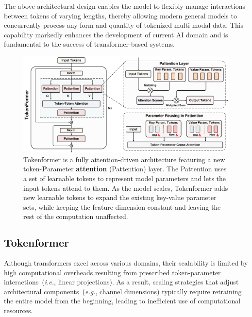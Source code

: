 \documentclass{article} %
\newcommand{\ourmethod}{Tokenformer\xspace}
\begin{document}
The above architectural design enables the model to flexibly manage interactions between tokens of varying lengths, thereby allowing modern general models to concurrently process any form and quantity of tokenized multi-modal data. This capability markedly enhances the development of current AI domain and is fundamental to the success of transformer-based systems.

\begin{figure}[h]
\centering
\includegraphics[width=\textwidth]{./arch2.pdf}
\caption{{\ourmethod} is a fully attention-driven architecture featuring a new token-\textbf{P}arameter \textbf{attention} (Pattention) layer. 
The Pattention uses a set of learnable tokens to represent model parameters and lets the input tokens attend to them. As the model scales, \ourmethod adds new learnable tokens to expand the existing key-value parameter sets, while keeping the feature dimension constant and leaving the rest of the computation unaffected.
}
\vspace{-8pt}
\label{fig:att_token_param}
\end{figure}

\subsection{\ourmethod} \label{sec:tokenformer}

Although transformers excel across various domains, their scalability is limited by high computational overheads resulting from prescribed token-parameter interactions~(\textit{i.e.}, linear projections). As a result, scaling strategies that adjust architectural components~(\textit{e.g.}, channel dimensions) typically require retraining the entire model from the beginning, leading to inefficient use of computational resources. 
\end{document}
